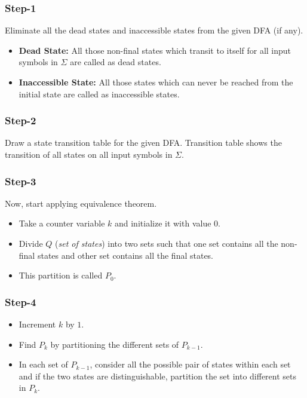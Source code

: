 \begin{multicols}{2}
\setlength{\columnsep}{1.5cm}
\setlength{\columnseprule}{0.2pt}

\subsubsection*{Step-1}

Eliminate all the dead states and inaccessible states from the given DFA (if any).

\begin{itemize}
  \item \textbf{Dead State:} All those non-final states which transit to itself for all input symbols in $\Sigma$ are called as dead states.
  \item \textbf{Inaccessible State:} All those states which can never be reached from the initial state are called as inaccessible states.
\end{itemize}

\subsubsection*{Step-2}

Draw a state transition table for the given DFA. Transition table shows the transition of all states on all input symbols in $\Sigma$.

\subsubsection*{Step-3}

Now, start applying equivalence theorem.
\begin{itemize}
  \item Take a counter variable $k$ and initialize it with value 0.
  \item Divide $Q$ (\textit{set of states}) into two sets such that one set contains all the non-final states and other set contains all the final states.
  \item This partition is called $P_0$.
\end{itemize}

\subsubsection*{Step-4}

\begin{itemize}
  \item Increment $k$ by $1$.
  \item Find $P_k$ by partitioning the different sets of $P_{k - 1}$.
  \item In each set of $P_{k - 1}$, consider all the possible pair of states within each set and if the two states are distinguishable, partition the set into different sets in $P_k$.
\end{itemize}


\end{multicols}
